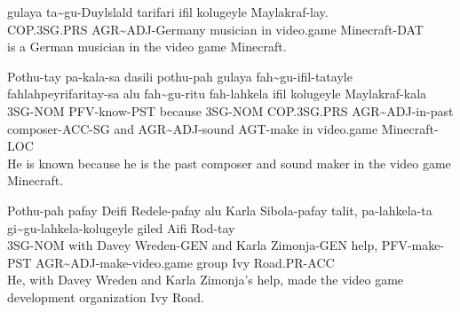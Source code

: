 \begin{exe}
    \ex{} \gll{}gulaya ta\~{}gu-Duylslald tarifari ifil kolugeyle Maylakraf-lay.\\
                COP.3SG.PRS AGR\~{}ADJ-Germany musician in video.game Minecraft-DAT\\
          \glt{}is a German musician in the video game Minecraft.
\end{exe}

\begin{exe}
    \ex{} \gll{}Pothu-tay pa-kala-sa dasili pothu-pah gulaya fah\~{}gu-ifil-tatayle fahlahpeyrifaritay-sa alu fah\~{}gu-ritu fah-lahkela ifil kolugeyle Maylakraf-kala\\
                3SG-NOM PFV-know-PST because 3SG-NOM COP.3SG.PRS AGR\~{}ADJ-in-past composer-ACC-SG and AGR\~{}ADJ-sound AGT-make in video.game Minecraft-LOC\\
          \glt{}He is known because he is the past composer and sound maker in the video game Minecraft.
\end{exe}

\begin{exe}
    \ex{} \gll{}Pothu-pah pafay Deifi Redele-pafay alu Karla Sibola-pafay talit, pa-lahkela-ta gi\~{}gu-lahkela-kolugeyle giled Aifi Rod-tay\\
                3SG-NOM with Davey Wreden-GEN and Karla Zimonja-GEN help, PFV-make-PST AGR\~{}ADJ-make-video.game group Ivy Road.PR-ACC\\
          \glt{}He, with Davey Wreden and Karla Zimonja's help, made the video game development organization Ivy Road.
\end{exe}

